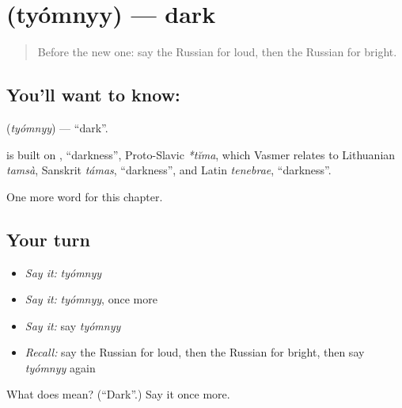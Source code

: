 \section[\texorpdfstring{\ru{тёмный} (tyómnyy)}{тёмный (tyómnyy)}]{ (tyómnyy) — dark}

\label{lesson:RU-C244-tyomnyy}



\begin{quote}
Before the new one: say the Russian for loud, then the Russian for bright.
\end{quote}

\subsection*{You'll want to know: }
\textbf{} (\emph{tyómnyy}) — \textquotedblleft{}dark\textquotedblright{}.

\begin{cousinweb}
\textbf{} is built on \emph{}, \textquotedblleft{}darkness\textquotedblright{}, Proto-Slavic \emph{*tĭma}, which Vasmer relates to Lithuanian \emph{tamsà}, Sanskrit \emph{támas}, \textquotedblleft{}darkness\textquotedblright{}, and Latin \emph{tenebrae}, \textquotedblleft{}darkness\textquotedblright{}.
\end{cousinweb}

\begin{grammarlens}[title={What you've built}]
One more word for this chapter.
\end{grammarlens}

\subsection*{Your turn}
\begin{itemize}
\raggedright
  \item \emph{Say it:} \emph{tyómnyy}
  \item \emph{Say it:} \emph{tyómnyy}, once more
  \item \emph{Say it:} say \emph{tyómnyy}
  \item \emph{Recall:} say the Russian for loud, then the Russian for bright, then say \emph{tyómnyy} again
\end{itemize}

\begin{tcolorbox}[breakable,colback=teal!4,colframe=teal!35!black,title={Before you move on}]
What does  mean? (\textquotedblleft{}Dark\textquotedblright{}.) Say it once more.
\end{tcolorbox}
